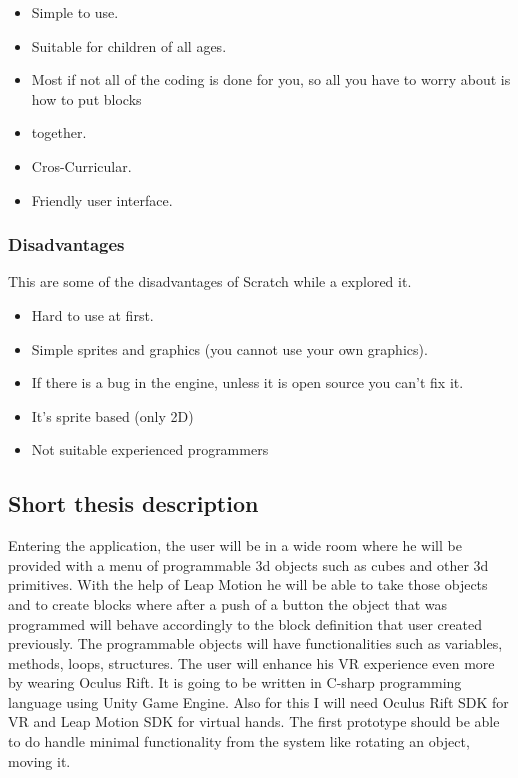 \begin{itemize}
\item Simple to use.
\item Suitable for children of all ages.
\item Most if not all of the coding is done for you, so all you have to worry about is how to put blocks \item together.
\item Cros-Curricular.
\item Friendly user interface.
\end{itemize}


\subsubsection{Disadvantages}
This are some of the disadvantages of Scratch while a explored it.
\begin{itemize}

\item Hard to use at first.
\item Simple sprites and graphics (you cannot use your own graphics).
\item If there is a bug in the engine, unless it is open source you can't fix it.
\item It's sprite based (only 2D)
\item Not suitable experienced programmers
	 
\end{itemize}



\subsection{Short thesis description}
Entering the application, the user will be in a wide room where he will be provided with a menu of programmable 3d objects such as cubes and other 3d primitives. With the help of Leap Motion he will be able to take those objects and to create blocks where after a push of a button the object that was programmed will behave accordingly to the block definition that user created previously. The programmable objects will have functionalities such as variables, methods, loops, structures. The user will enhance his VR experience even more by wearing Oculus Rift. It is going to be written in C-sharp programming language using Unity Game Engine. Also for this I will need Oculus Rift SDK for VR and Leap Motion SDK for virtual hands. The first prototype should be able to do handle minimal functionality from the system like rotating an object, moving it.

